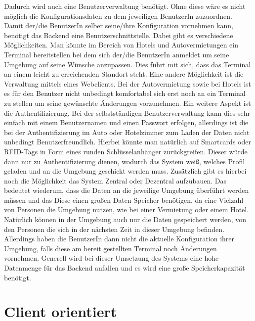 Dadurch wird auch eine Benutzerverwaltung benötigt. Ohne diese wäre es nicht möglich die Konfigurationsdaten zu dem jeweiligen BenutzerIn zuzuordnen. Damit der/die BenutzerIn selber seine/ihre Konfiguration vornehmen kann, benötigt das Backend eine Benutzerschnittstelle. Dabei gibt es verschiedene Möglichkeiten. Man könnte im Bereich von Hotels und Autovermietungen ein Terminal bereitstellen bei dem sich der/die BenutzerIn anmeldet um seine Umgebung auf seine Wünsche anzupassen. Dies führt mit sich, dass das Terminal an einem leicht zu erreichenden Standort steht. Eine andere Möglichkeit ist die Verwaltung mittels eines Webclients. Bei der Autovermietung sowie bei Hotels ist es für den Benutzer nicht unbedingt komfortabel sich erst noch an ein Terminal zu stellen um seine gewünschte Änderungen vorzunehmen. 
Ein weitere Aspekt ist die Authentifizierung. Bei der selbstständigen Benutzerverwaltung kann dies sehr einfach mit einem Benutzernamen und einen Passwort erfolgen, allerdings ist die bei der Authentifizierung im Auto oder Hotelzimmer zum Laden der Daten nicht unbedingt Benutzerfreundlich. Hierbei könnte man natürlich auf Smartcards oder RFID-Tags in Form eines runden Schlüsselanhänger zurückgreifen. Dieser würde dann nur zu Authentifizierung dienen, wodurch das System weiß, welches Profil geladen und an die Umgebung geschickt werden muss. Zusätzlich gibt es hierbei noch die Möglichkeit das System Zentral oder Dezentral aufzubauen. Das bedeutet wiederum, dass die Daten an die jeweilige Umgebung überführt werden müssen und das Diese einen großen Daten Speicher benötigen, da eine Vielzahl von Personen die Umgebung nutzen, wie bei einer Vermietung oder einem Hotel. Natürlich können in der Umgebung auch nur die Daten gespeichert werden, von den Personen die sich in der nächsten Zeit in dieser Umgebung befinden. Allerdings haben die BenutzerIn dann nicht die aktuelle Konfiguration ihrer Umgebung, falls diese am bereit gestellten Terminal noch Änderungen vornehmen.  
Generell wird bei dieser Umsetzung des Systems eine hohe Datenmenge für das Backend anfallen und es wird eine große Speicherkapazität benötigt.

\section{Client orientiert}

